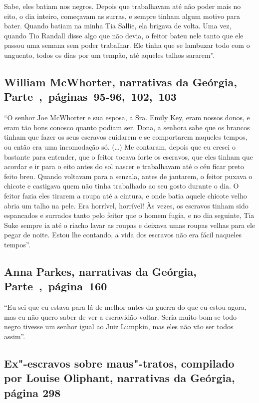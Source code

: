 Sabe, eles batiam nos negros. Depois que trabalhavam até não poder mais
no eito, o dia inteiro, começavam as surras, e sempre tinham algum
motivo para bater. Quando batiam na minha Tia Sallie, ela brigava de
volta. Uma vez, quando Tio Randall disse algo que não devia, o feitor
bateu nele tanto que ele passou uma semana sem poder trabalhar. Ele
tinha que se lambuzar todo com o unguento, todos os dias por um tempão,
até aqueles talhos sararem''.

\subsection{William McWhorter, narrativas da Geórgia, Parte~,~páginas~95-96,~102,~103}
\label{ref190}

``O senhor Joe McWhorter e sua esposa, a Sra. Emily Key, eram nossos
donos, e eram tão bons conosco quanto podiam ser. Dona, a senhora sabe
que os brancos tinham que fazer os seus escravos cuidarem e se
comportarem naqueles tempos, ou então era uma incomodação só. (\ldots{})
Me contaram, depois que eu cresci o bastante para entender, que o feitor
tocava forte os escravos, que eles tinham que acordar e ir para o eito
antes do sol nascer e trabalhavam até o céu ficar preto feito breu.
Quando voltavam para a senzala, antes de jantarem, o feitor puxava o
chicote e castigava quem não tinha trabalhado ao seu gosto durante o
dia. O feitor fazia eles tirarem a roupa até a cintura, e onde batia
aquele chicote velho abria um talho na pele. Era horrível, horrível! Às
vezes, os escravos tinham sido espancados e surrados tanto pelo feitor
que o homem fugia, e no dia seguinte, Tia Suke sempre ia até o riacho
lavar as roupas e deixava umas roupas velhas para ele pegar de noite.
Estou lhe contando, a vida dos escravos não era fácil naqueles tempos''.

\subsection{Anna Parkes, narrativas da Geórgia, Parte~,~página~160}
\label{ref208}

``Eu sei que eu estava para lá de melhor antes da guerra do que eu estou
agora, mas eu não quero saber de ver a escravidão voltar. Seria muito
bom se todo negro tivesse um senhor igual ao Juiz Lumpkin, mas eles não
vão ser todos assim''.

\subsection{Ex"-escravos sobre maus"-tratos, compilado por Louise Oliphant, narrativas
da Geórgia, página 298}

